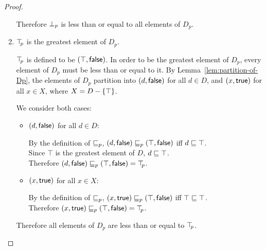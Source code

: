 \begin{proof}
\begin{enumerate}
\begin{itemize}
  \end{itemize}

  Therefore $\bot_{p}$ is less than or equal to all elements of $D_p$.

\item $\top\hspace{-0.85mm}_{p}$ is the greatest element of $D_p$.

$\top\hspace{-0.85mm}_{p}$ is defined to be $(\top, \textsf{false})$.  In order to be the
  greatest element of $D_p$, every element of $D_p$ must be less than
  or equal to it. By Lemma~\ref{lem:partition-of-Dp}, the elements of
  $D_p$ partition into $(d, \textsf{false})$ for all $d \in D$, and $(x, \textsf{true})$ for all $x \in X$, where $X = D - \left\{\top\right\}$.

  We consider both cases:

  \begin{itemize}
  \item $(d, \textsf{false})$ for all $d \in D$:

  By the definition of $\sqsubseteq_p$, $(d, \textsf{false}) \sqsubseteq_p (\top, \textsf{false})$ iff $d \sqsubseteq \top$. \\
  Since $\top$ is the greatest element of $D$, $d \sqsubseteq \top$. \\
  Therefore $(d, \textsf{false}) \sqsubseteq_p (\top, \textsf{false}) = \top\hspace{-0.85mm}_{p}$.

  \item $(x, \textsf{true})$ for all $x \in X$:

  By the definition of $\sqsubseteq_p$, $(x, \textsf{true}) \sqsubseteq_p (\top, \textsf{false})$ iff $\top \sqsubseteq \top$. \\
  Therefore $(x, \textsf{true}) \sqsubseteq_p (\top, \textsf{false}) = \top\hspace{-0.85mm}_{p}$.

  \end{itemize}

  Therefore all elements of $D_p$ are less than or equal to $\top\hspace{-0.85mm}_{p}$.
\end{enumerate}
\end{proof}
